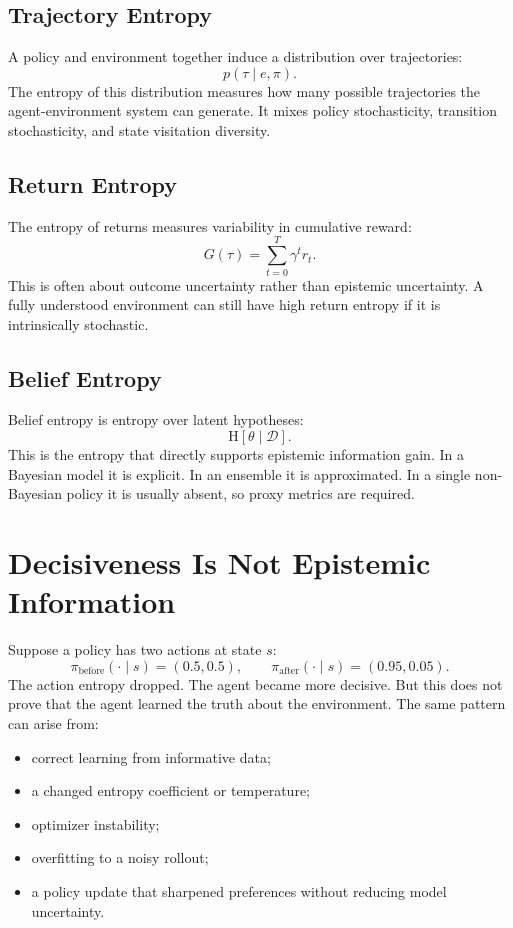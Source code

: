 \documentclass[11pt]{article}
\newcommand{\D}{\mathcal{D}}
\newcommand{\Hent}{\mathrm{H}}
\begin{document}
\subsection{Trajectory Entropy}

A policy and environment together induce a distribution over trajectories:
\begin{equation}
  p(\tau \mid e,\pi).
\end{equation}
The entropy of this distribution measures how many possible trajectories the
agent-environment system can generate. It mixes policy stochasticity, transition
stochasticity, and state visitation diversity.

\subsection{Return Entropy}

The entropy of returns measures variability in cumulative reward:
\begin{equation}
  G(\tau)=\sum_{t=0}^{T}\gamma^t r_t.
\end{equation}
This is often about outcome uncertainty rather than epistemic uncertainty. A
fully understood environment can still have high return entropy if it is
intrinsically stochastic.

\subsection{Belief Entropy}

Belief entropy is entropy over latent hypotheses:
\begin{equation}
  \Hent[\theta \mid \D].
\end{equation}
This is the entropy that directly supports epistemic information gain. In a
Bayesian model it is explicit. In an ensemble it is approximated. In a single
non-Bayesian policy it is usually absent, so proxy metrics are required.

\section{Decisiveness Is Not Epistemic Information}

Suppose a policy has two actions at state $s$:
\begin{equation}
  \pi_{\mathrm{before}}(\cdot \mid s)=(0.5,0.5),
  \qquad
  \pi_{\mathrm{after}}(\cdot \mid s)=(0.95,0.05).
\end{equation}
The action entropy dropped. The agent became more decisive. But this does not
prove that the agent learned the truth about the environment. The same pattern
can arise from:
\begin{itemize}[leftmargin=*]
  \item correct learning from informative data;
  \item a changed entropy coefficient or temperature;
  \item optimizer instability;
  \item overfitting to a noisy rollout;
  \item a policy update that sharpened preferences without reducing model
  uncertainty.
\end{itemize}
\end{document}
